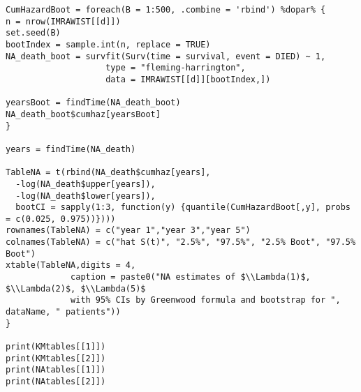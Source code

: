 \documentclass[11pt]{article}
\begin{document}
\begin{lstlisting}
CumHazardBoot = foreach(B = 1:500, .combine = 'rbind') %dopar% {
n = nrow(IMRAWIST[[d]])
set.seed(B)
bootIndex = sample.int(n, replace = TRUE)
NA_death_boot = survfit(Surv(time = survival, event = DIED) ~ 1,
                    type = "fleming-harrington",
                    data = IMRAWIST[[d]][bootIndex,])

yearsBoot = findTime(NA_death_boot)
NA_death_boot$cumhaz[yearsBoot]
}

years = findTime(NA_death)

TableNA = t(rbind(NA_death$cumhaz[years],
  -log(NA_death$upper[years]),
  -log(NA_death$lower[years]),
  bootCI = sapply(1:3, function(y) {quantile(CumHazardBoot[,y], probs = c(0.025, 0.975))})))
rownames(TableNA) = c("year 1","year 3","year 5")
colnames(TableNA) = c("hat S(t)", "2.5%", "97.5%", "2.5% Boot", "97.5% Boot")
xtable(TableNA,digits = 4, 
             caption = paste0("NA estimates of $\\Lambda(1)$, $\\Lambda(2)$, $\\Lambda(5)$ 
             with 95% CIs by Greenwood formula and bootstrap for ", dataName, " patients"))
}

print(KMtables[[1]])
print(KMtables[[2]])
print(NAtables[[1]])
print(NAtables[[2]])

\end{lstlisting}
\end{document}
